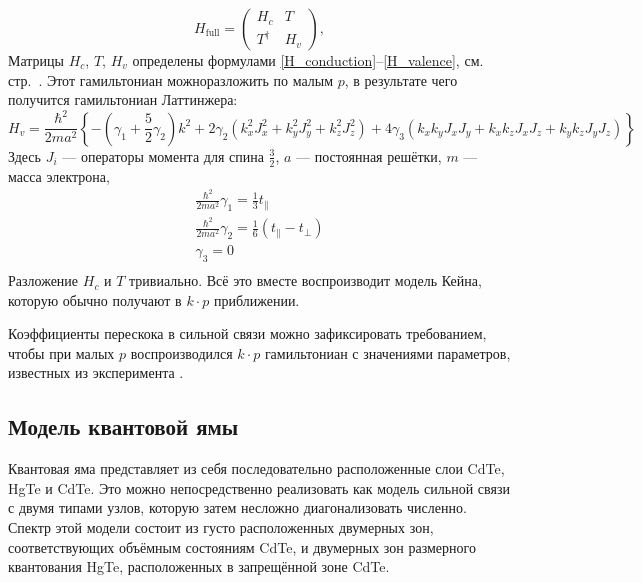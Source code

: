 \begin{equation}
    \label{hfull}
    H_{\mathrm{full}} = \begin{pmatrix}
                            H_c & T \\
                            T^\dagger & H_v
                        \end{pmatrix},
\end{equation}
Матрицы $H_c$, $T$, $H_v$ определены формулами \eqref{H_conduction}--\eqref{H_valence}, см.
стр.~\pageref{H_conduction}.
Этот гамильтониан можноразложить по малым $p$,
в результате чего получится гамильтониан Латтинжера:
\begin{equation}
    H_v = \frac{\hbar^2}{2ma^2}\left\{-\left(\gamma_1 + \frac{5}{2}\gamma_2\right) k^2 + 
        2\gamma_2(k_x^2J_x^2 + k_y^2J_y^2 + k_z^2J_z^2) + 
        4\gamma_3(k_x k_y J_x J_y + k_x k_z J_x J_z + k_y k_z J_y J_z) \right\}
\end{equation}
Здесь $J_i$ --- операторы момента для спина $\frac{3}{2}$, $a$ --- постоянная решётки,
$m$ --- масса электрона,
\begin{equation}
    \begin{gathered}
        \frac{\hbar^2}{2ma^2}\gamma_1 = \frac13 t_\parallel\\
        \frac{\hbar^2}{2ma^2}\gamma_2 = \frac16(t_\parallel - t_\perp)\\
        \gamma_3 = 0\\
    \end{gathered}
\end{equation}
Разложение $H_c$ и $T$ тривиально.
Всё это вместе воспроизводит модель Кейна, которую обычно получают в $k \cdot p$ приближении.

Коэффициенты перескока в сильной связи можно зафиксировать требованием, чтобы при малых $p$ 
воспроизводился $k\cdot p$ гамильтониан с значениями параметров, известных из эксперимента
\cite{Novik2005}. 


\subsection{Модель квантовой ямы}
Квантовая яма представляет из себя последовательно расположенные слои CdTe, HgTe и CdTe.
Это можно непосредственно реализовать как модель сильной связи с двумя типами узлов, которую
затем несложно диагонализовать численно. Спектр этой модели состоит из густо расположенных
двумерных зон, соответствующих объёмным состояниям CdTe, и двумерных зон размерного квантования
HgTe, расположенных в запрещённой зоне CdTe.

